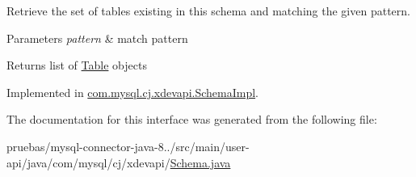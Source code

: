 Retrieve the set of tables existing in this schema and matching the given pattern.


\begin{DoxyParams}{Parameters}
{\em pattern} & match pattern \\
\hline
\end{DoxyParams}
\begin{DoxyReturn}{Returns}
list of \mbox{\hyperlink{interfacecom_1_1mysql_1_1cj_1_1xdevapi_1_1_table}{Table}} objects 
\end{DoxyReturn}


Implemented in \mbox{\hyperlink{classcom_1_1mysql_1_1cj_1_1xdevapi_1_1_schema_impl_ae9ce3609e108dc05f1e4ca978d490b81}{com.\+mysql.\+cj.\+xdevapi.\+Schema\+Impl}}.



The documentation for this interface was generated from the following file\+:\begin{DoxyCompactItemize}
\item 
pruebas/mysql-\/connector-\/java-\/8../src/main/user-\/api/java/com/mysql/cj/xdevapi/\mbox{\hyperlink{_schema_8java}{Schema.\+java}}\end{DoxyCompactItemize}
